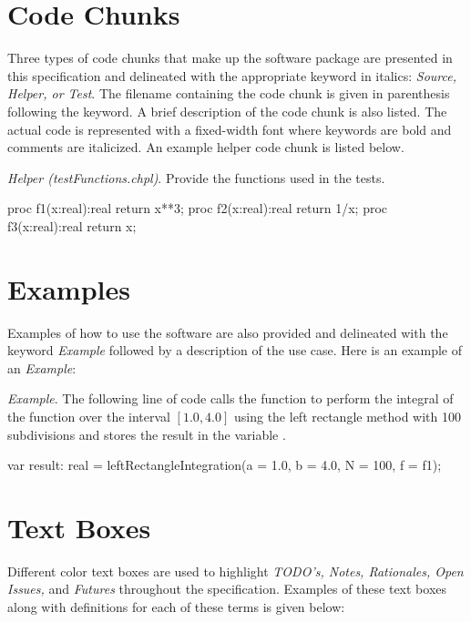\label{Notation}

\section{Code Chunks}

Three types of code chunks that make up the software package are 
presented in this specification and delineated
with the appropriate keyword in italics: 
\textit{Source, Helper, or Test}.  The filename containing the code
chunk is given in parenthesis following the keyword. A brief description 
of the code chunk is also listed.
The actual code is represented with a fixed-width font where keywords are
bold and comments are italicized. An example helper code chunk is listed
below.

\textit{Helper (testFunctions.chpl)}. Provide the functions used
in the tests.
\begin{chapel}
  proc f1(x:real):real {
    return x**3;
  } 
  proc f2(x:real):real {
    return 1/x;
  } 
  proc f3(x:real):real {
    return x;
  } 
\end{chapel}

\section{Examples}

Examples of how to use the software are also provided and delineated with the
keyword \textit{Example} followed by a description of the use case. Here is
an example of an \textit{Example}:

\textit{Example}. The following line of code calls the function
 to perform the integral of the function 
over the interval $[1.0,4.0]$ using the left rectangle method with 100 subdivisions
and stores the result in the variable .
\begin{chapel}
  var result: real = leftRectangleIntegration(a = 1.0, b = 4.0, N = 100, f = f1);
\end{chapel}

\section{Text Boxes}
Different color text boxes are used to highlight \textit{TODO's, Notes,
Rationales, Open Issues,} and \textit{Futures} throughout the specification.
Examples of these text boxes along with definitions for each of these terms
is given below:

